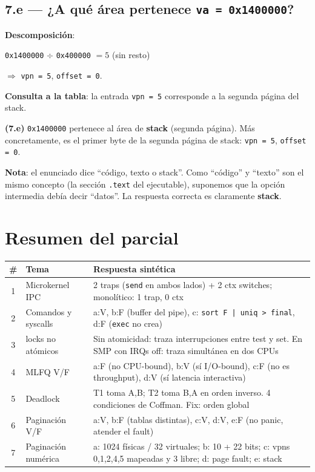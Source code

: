 \documentclass[11pt,a4paper]{article}
\begin{document}
\subsection*{7.e --- ¿A qué área pertenece \texttt{va = 0x1400000}?}

\textbf{Descomposición}:

\quad \texttt{0x1400000} $\div$ \texttt{0x400000} $= 5$ (sin resto)

\quad $\Rightarrow$ \texttt{vpn = 5}, \texttt{offset = 0}.

\textbf{Consulta a la tabla}: la entrada \texttt{vpn = 5} corresponde
a la segunda página del stack.

\begin{respuesta}
\textbf{(7.e)} \texttt{0x1400000} pertenece al área de \textbf{stack}
(segunda página). Más concretamente, es el primer byte de la segunda
página de stack: \texttt{vpn = 5}, \texttt{offset = 0}.

\textbf{Nota}: el enunciado dice ``código, texto o stack''. Como
``código'' y ``texto'' son el mismo concepto (la sección
\texttt{.text} del ejecutable), suponemos que la opción intermedia
debía decir ``datos''. La respuesta correcta es claramente
\textbf{stack}.
\end{respuesta}

\section*{Resumen del parcial}

\begin{center}
\small
\begin{tabular}{@{}clp{8.5cm}@{}}
\toprule
\# & Tema & Respuesta sintética \\
\midrule
1 & Microkernel IPC      & 2 traps (\texttt{send} en ambos lados) + 2 ctx switches; monolítico: 1 trap, 0 ctx \\
2 & Comandos y syscalls  & a:V, b:F (buffer del pipe), c: \texttt{sort F | uniq > final}, d:F (\texttt{exec} no crea) \\
3 & locks no atómicos    & Sin atomicidad: traza interrupciones entre test y set. En SMP con IRQs off: traza simultánea en dos CPUs \\
4 & MLFQ V/F             & a:F (no CPU-bound), b:V (sí I/O-bound), c:F (no es throughput), d:V (sí latencia interactiva) \\
5 & Deadlock             & T1 toma A,B; T2 toma B,A en orden inverso. 4 condiciones de Coffman. Fix: orden global \\
6 & Paginación V/F       & a:V, b:F (tablas distintas), c:V, d:V, e:F (no panic, atender el fault) \\
7 & Paginación numérica  & a: 1024 físicas / 32 virtuales; b: 10 + 22 bits; c: vpns 0,1,2,4,5 mapeadas y 3 libre; d: page fault; e: stack \\
\bottomrule
\end{tabular}
\end{center}
\end{document}
